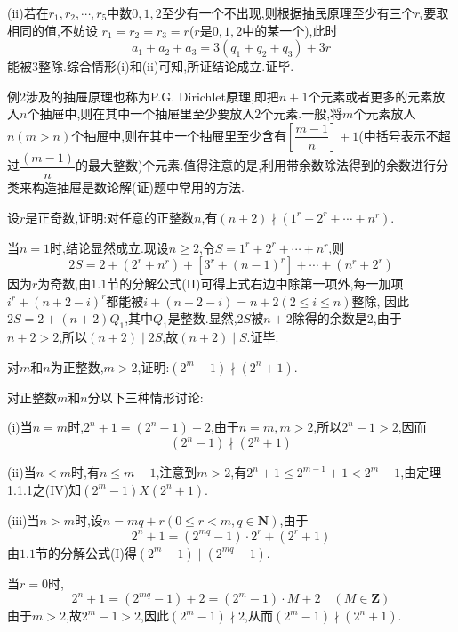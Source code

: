 (ii)若在$r_{1}, r_{2}, \cdots, r_{5}$中数$0,1,2$至少有一个不出现,则根据抽民原理至少有三个$r_{i}$要取相同的值,不妨设 $r_{1}=r_{2}=r_{3}=r$($r$是$0,1,2$中的某一个),此时
\begin{equation*}
	a_{1}+a_{2}+a_{3}=3\left(q_{1}+q_{2}+q_{3}\right)+3 r
\end{equation*}
能被3整除.综合情形(i)和(ii)可知,所证结论成立.证毕.

\remark 例2涉及的抽屉原理也称为P.G. Dirichlet原理,即把$n+1$个元素或者更多的元素放入$n$个抽屉中,则在其中一个抽屉里至少要放入$2$个元素.一般,将$m$个元素放人 $n(m>n)$个抽屉中,则在其中一个抽屉里至少含有$\left[\dfrac{m-1}{n}\right]+1$(中括号表示不超过$\dfrac{(m-1)}{n}$的最大整数)个元素.值得注意的是,利用带余数除法得到的余数进行分类来构造抽屉是数论解(证)题中常用的方法.

\example 设$r$是正奇数,证明:对任意的正整数$n$,有$(n+2)\nmid (1^{r}+2^{r}+\cdots+n^{r})$.

\proof 当$n=1$时,结论显然成立.现设$n \geqslant 2$,令$S=1^{r}+2^{r}+\cdots+n^{r}$,则
\begin{equation*}
	2 S=2+\left(2^{r}+n^{r}\right)+\left[3^{r}+(n-1)^{r}\right]+\cdots+\left(n^{r}+2^{r}\right)
\end{equation*}
因为$r$为奇数,由$1.1$节的分解公式(II)可得上式右边中除第一项外,每一加项$i^{r}+(n+2-i)^{r}$都能被$i+(n+2-i)=n+2(2 \leqslant i \leqslant n)$整除, 因此$2 S=2+(n+2) Q_{1}$,其中$Q_{1}$是整数.显然,$2 S$被$n+2$除得的余数是$2$,由于 $n+2>2$,所以$(n+2) \mid 2 S$,故$(n+2) \mid S$.证毕.

\example 对$m$和$n$为正整数,$m>2$,证明:$(2^{m}-1)\nmid(2^{n}+1)$.

\proof 对正整数$m$和$n$分以下三种情形讨论:

(i)当$n=m$时,$2^{n}+1=\left(2^{n}-1\right)+2$,由于$n=m, m>2$,所以$2^{n}-1>2$,因而
\begin{equation*}
	\left(2^{n}-1\right)\nmid\left(2^{n}+1\right)
\end{equation*}

(ii)当$n<m$时,有$n \leqslant m-1$,注意到$m>2$,有$2^{n}+1 \leqslant 2^{m-1}+1<2^{m}-1$,由定理1.1.1之(IV)知$\left(2^{m}-1\right) X\left(2^{n}+1\right)$.

(iii)当$n>m$时,设$n=m q+r(0 \leqslant r<m, q \in \mathbf{N})$,由于
\begin{equation*}
	2^{n}+1=\left(2^{m q}-1\right) \cdot 2^{r}+\left(2^{r}+1\right)
\end{equation*}
由$1.1$节的分解公式(I)得$\left(2^{m}-1\right) \mid\left(2^{m q}-1\right)$.

当$r=0$时,
\begin{equation*}
	2^{n}+1=\left(2^{m q}-1\right)+2=\left(2^{m}-1\right) \cdot M+2 \quad(M \in \mathbf{Z})
\end{equation*}
由于$m>2$,故$2^{m}-1>2$,因此$\left(2^{m}-1\right)\nmid 2$,从而$\left(2^{m}-1\right)\nmid\left(2^{n}+1\right)$.

